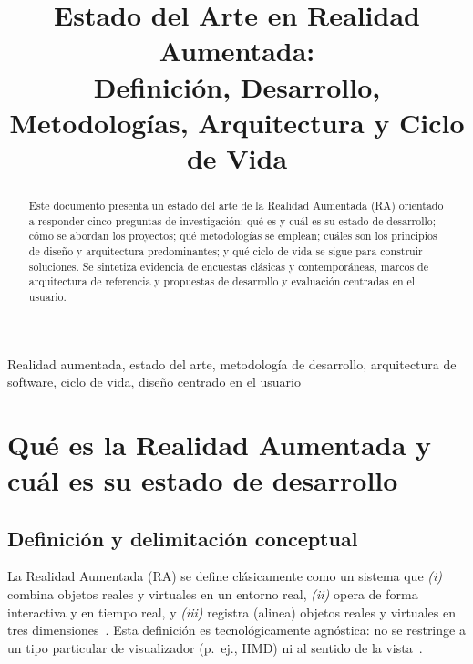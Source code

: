 \documentclass[conference]{IEEEtran}
\begin{document}
\title{Estado del Arte en Realidad Aumentada:\\
Definici\'on, Desarrollo, Metodolog\'ias, Arquitectura y Ciclo de Vida}

\author{
}

\maketitle

\begin{abstract}
Este documento presenta un estado del arte de la Realidad Aumentada (RA) orientado a responder cinco preguntas de investigaci\'on: qu\'e es y cu\'al es su estado de desarrollo; c\'omo se abordan los proyectos; qu\'e metodolog\'ias se emplean; cu\'ales son los principios de dise\~no y arquitectura predominantes; y qu\'e ciclo de vida se sigue para construir soluciones. Se sintetiza evidencia de encuestas cl\'asicas y contempor\'aneas, marcos de arquitectura de referencia y propuestas de desarrollo y evaluaci\'on centradas en el usuario.
\end{abstract}

\begin{IEEEkeywords}
Realidad aumentada, estado del arte, metodolog\'ia de desarrollo, arquitectura de software, ciclo de vida, dise\~no centrado en el usuario
\end{IEEEkeywords}

\section{Qu\'e es la Realidad Aumentada y cu\'al es su estado de desarrollo}

\subsection{Definici\'on y delimitaci\'on conceptual}
La Realidad Aumentada (RA) se define cl\'asicamente como un sistema que \emph{(i)} combina objetos reales y virtuales en un entorno real, \emph{(ii)} opera de forma interactiva y en tiempo real, y \emph{(iii)} registra (alinea) objetos reales y virtuales en tres dimensiones~\cite{azuma1997survey}. Esta definici\'on es tecnol\'ogicamente agn\'ostica: no se restringe a un tipo particular de visualizador (p.~ej., HMD) ni al sentido de la vista~\cite{azuma2001recent}.
\end{document}
